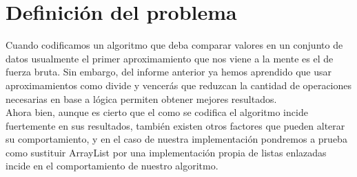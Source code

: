 \section{Definición del problema}
Cuando codificamos un algoritmo que deba comparar valores en un conjunto de datos usualmente el primer aproximamiento que nos viene a la mente es el de fuerza bruta. Sin embargo, del informe anterior ya hemos aprendido que usar aproximamientos como divide y vencerás que reduzcan la cantidad de operaciones necesarias en base a lógica permiten obtener mejores resultados.\\

Ahora bien, aunque es cierto que el como se codifica el algoritmo incide fuertemente en sus resultados, también existen otros factores que pueden alterar su comportamiento, y en el caso de nuestra implementación pondremos a prueba como sustituir ArrayList por una implementación propia de listas enlazadas incide en el comportamiento de nuestro algoritmo.